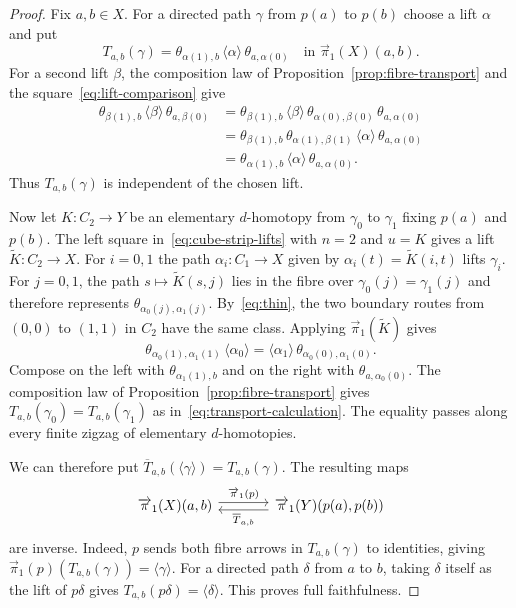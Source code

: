 \documentclass[12pt,a4paper]{amsart}
\theoremstyle{definition}
\renewcommand{\vec}{\overrightarrow}
\newcommand{\cube}[1]{C_{#1}}
\newcommand{\PiC}{\vec{\pi}_1}
\newcommand{\clp}[1]{\langle #1\rangle}
\begin{document}
\begin{proof}
Fix $a,b\in X$. For a directed path $\gamma$ from $p(a)$ to $p(b)$ choose a lift $\alpha$ and put
\[
 T_{a,b}(\gamma)=\theta_{\alpha(1),b}\,\clp{\alpha}\,\theta_{a,\alpha(0)}
 \quad\text{in }\PiC(X)(a,b).
\]
For a second lift $\beta$, the composition law of Proposition~\ref{prop:fibre-transport} and the square~\eqref{eq:lift-comparison} give
\begin{equation}\label{eq:transport-calculation}
\begin{aligned}
 \theta_{\beta(1),b}\,\clp{\beta}\,\theta_{a,\beta(0)}
 &=\theta_{\beta(1),b}\,\clp{\beta}\,\theta_{\alpha(0),\beta(0)}\,\theta_{a,\alpha(0)}\\
 &=\theta_{\beta(1),b}\,\theta_{\alpha(1),\beta(1)}\,\clp{\alpha}\,\theta_{a,\alpha(0)}\\
 &=\theta_{\alpha(1),b}\,\clp{\alpha}\,\theta_{a,\alpha(0)}.
\end{aligned}
\end{equation}
Thus $T_{a,b}(\gamma)$ is independent of the chosen lift.

Now let $K\colon\cube2\to Y$ be an elementary $d$-homotopy from $\gamma_0$ to $\gamma_1$ fixing $p(a)$ and $p(b)$. The left square in~\eqref{eq:cube-strip-lifts} with $n=2$ and $u=K$ gives a lift $\widetilde K\colon\cube2\to X$. For $i=0,1$ the path $\alpha_i\colon\cube1\to X$ given by $\alpha_i(t)=\widetilde K(i,t)$ lifts $\gamma_i$. For $j=0,1$, the path $s\mapsto\widetilde K(s,j)$ lies in the fibre over $\gamma_0(j)=\gamma_1(j)$ and therefore represents $\theta_{\alpha_0(j),\alpha_1(j)}$. By~\eqref{eq:thin}, the two boundary routes from $(0,0)$ to $(1,1)$ in $\cube2$ have the same class. Applying $\PiC(\widetilde K)$ gives
\[
 \theta_{\alpha_0(1),\alpha_1(1)}\,\clp{\alpha_0}
 =\clp{\alpha_1}\,\theta_{\alpha_0(0),\alpha_1(0)}.
\]
Compose on the left with $\theta_{\alpha_1(1),b}$ and on the right with $\theta_{a,\alpha_0(0)}$. The composition law of Proposition~\ref{prop:fibre-transport} gives $T_{a,b}(\gamma_0)=T_{a,b}(\gamma_1)$ as in~\eqref{eq:transport-calculation}. The equality passes along every finite zigzag of elementary $d$-homotopies.

We can therefore put $\overline T_{a,b}(\clp{\gamma})=T_{a,b}(\gamma)$. The resulting maps
\[
\begin{tikzcd}[column sep=large]
 \PiC(X)(a,b) \ar[r,shift left=0.6ex,"\PiC(p)"] &
 \PiC(Y)(p(a),p(b)) \ar[l,shift left=0.6ex,"{\overline T_{a,b}}"]
\end{tikzcd}
\]
are inverse. Indeed, $p$ sends both fibre arrows in $T_{a,b}(\gamma)$ to identities, giving $\PiC(p)(T_{a,b}(\gamma))=\clp{\gamma}$. For a directed path $\delta$ from $a$ to $b$, taking $\delta$ itself as the lift of $p\delta$ gives $T_{a,b}(p\delta)=\clp{\delta}$. This proves full faithfulness.
\end{proof}
\end{document}
